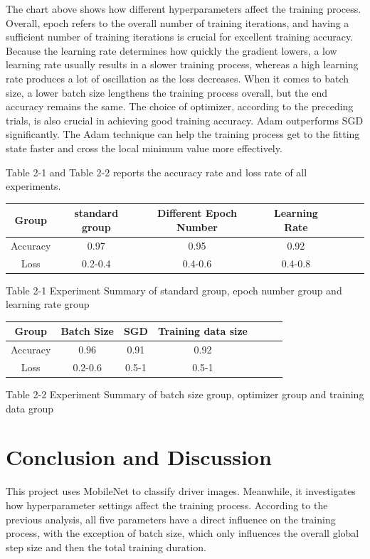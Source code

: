 \documentclass[11pt]{article}
\begin{document}
The chart above shows how different hyperparameters affect the training
process. Overall, epoch refers to the overall number of training
iterations, and having a suﬀicient number of training iterations is
crucial for excellent training accuracy. Because the learning rate
determines how quickly the gradient lowers, a low learning rate usually
results in a slower training process, whereas a high learning rate
produces a lot of oscillation as the loss decreases. When it comes to
batch size, a lower batch size lengthens the training process overall,
but the end accuracy remains the same. The choice of optimizer,
according to the preceding trials, is also crucial in achieving good
training accuracy. Adam outperforms SGD significantly. The Adam
technique can help the training process get to the fitting state faster
and cross the local minimum value more effectively.

Table 2-1 and Table 2-2 reports the accuracy rate and loss rate of all experiments.

\begin{tabular}{|c|c|c|c|c|c|c|}%
\hline
Group & standard group & Different Epoch Number & Learning Rate \\
\hline
Accuracy & 0.97 & 0.95 & 0.92 \\
Loss & 0.2-0.4 & 0.4-0.6 & 0.4-0.8 \\
\hline
\end{tabular}

Table 2-1 Experiment Summary of standard group, epoch number group and learning rate group

\begin{tabular}{|c|c|c|c|c|c|c|}%
    \hline
    Group & Batch Size & SGD & Training data size \\
    \hline
    Accuracy & 0.96 & 0.91 & 0.92 \\
    Loss & 0.2-0.6 & 0.5-1 & 0.5-1 \\
    \hline
    \end{tabular}
    
    Table 2-2 Experiment Summary of batch size group, optimizer group and training data group 

    \hypertarget{conclusion-and-discussion}{%
\section{Conclusion and Discussion}\label{conclusion-and-discussion}}

This project uses MobileNet to classify driver images. Meanwhile, it
investigates how hyperparameter settings affect the training process.
According to the previous analysis, all five parameters have a direct
influence on the training process, with the exception of batch size,
which only influences the overall global step size and then the total
training duration.
\end{document}
